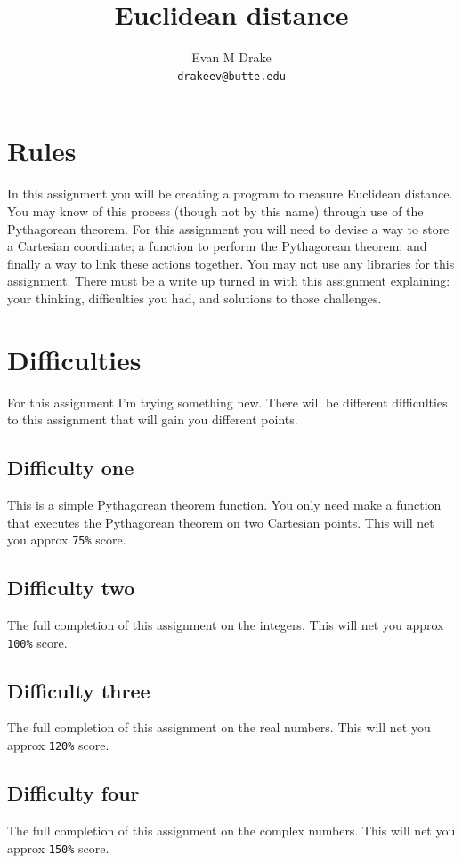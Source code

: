 \documentclass[12pt]{article}
\title{Euclidean distance}
\author{
	Evan M Drake \\
	\texttt{drakeev@butte.edu}
}
\begin{document}
	\maketitle

	\section{Rules}
		\indent In this assignment you will be creating a program to  measure Euclidean distance.
		You may know of this process (though not by this name) through use of the Pythagorean theorem.
		For this assignment you will need to devise a way to store a Cartesian coordinate;
			a function to perform the  Pythagorean theorem;
			and finally a way to link these actions together.
		You may not use any libraries for this assignment.
		There must be a write up turned in with this assignment explaining: your thinking,
			difficulties you had,
			and solutions to those challenges.

	\section{Difficulties}
		\indent For this assignment I'm trying something new.
		There will be different difficulties to this assignment that will gain you different points.
		\subsection{Difficulty one}
			\indent This is a simple Pythagorean theorem function.
			You only need make a function that executes the Pythagorean theorem on two Cartesian points.
			This will net you approx \verb|75%| score.

		\subsection{Difficulty two}
			\indent The full completion of this assignment on the integers.
			This will net you approx \verb|100%| score.

		\subsection{Difficulty three}
			\indent The full completion of this assignment on the real numbers.
			This will net you approx \verb|120%| score.

		\subsection{Difficulty four}
			\indent The full completion of this assignment on the complex numbers.
			This will net you approx \verb|150%| score.
\end{document}
